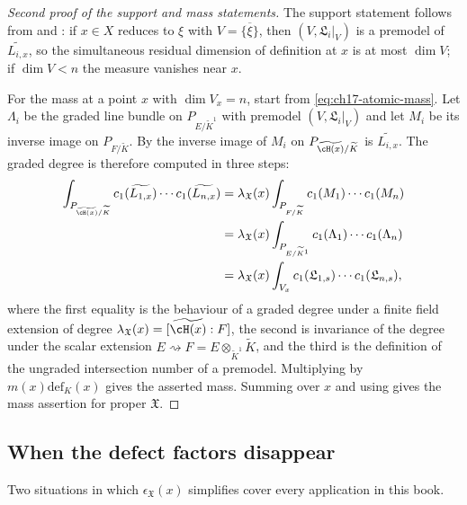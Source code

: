 \begin{proof}[Second proof of the support and mass statements]
The support statement follows from  and
: if $x\in X$ reduces to $\xi$ with
$V=\overline{\{\xi\}}$, then $(V,\mathfrak L_i|_V)$ is a premodel of
$\widetilde{L_{i,x}}$, so the simultaneous residual dimension of
definition at $x$ is at most $\dim V$; if $\dim V<n$ the measure
vanishes near $x$.

For the mass at a point $x$ with $\dim V_x=n$, start from
\eqref{eq:ch17-atomic-mass}.  Let $\Lambda_i$ be the graded line bundle on
$P_{E/\widetilde K^1}$ with premodel $(V,\mathfrak L_i|_V)$ and let
$M_i$ be its inverse image on $P_{F/\widetilde K}$.  By
 the inverse image of $M_i$ on
$P_{\widetilde{\cH(x)}/\widetilde K}$ is $\widetilde{L_{i,x}}$.  The
graded degree is therefore computed in three steps:
\[
\begin{split}
 \int_{P_{\widetilde{\cH(x)}/\widetilde K}}
   c_1(\widetilde{L_{1,x}})\cdots c_1(\widetilde{L_{n,x}})
 &=\lambda_{\mathfrak X}(x)
   \int_{P_{F/\widetilde K}}c_1(M_1)\cdots c_1(M_n)\\
 &=\lambda_{\mathfrak X}(x)
   \int_{P_{E/\widetilde K^1}}c_1(\Lambda_1)\cdots c_1(\Lambda_n)\\
 &=\lambda_{\mathfrak X}(x)
   \int_{V_x}c_1(\mathfrak L_{1,s})\cdots c_1(\mathfrak L_{n,s}),
\end{split}
\]
where the first equality is the behaviour of a graded degree under a finite
field extension of degree $\lambda_{\mathfrak X}(x)=[\widetilde{\cH(x)}:F]$,
the second is invariance of the degree under the scalar extension
$E\rightsquigarrow F=E\otimes_{\widetilde K^1}\widetilde K$, and the third
is the definition of the ungraded intersection number of a premodel.
Multiplying by $m(x)\mathrm{def}_K(x)$ gives the asserted mass.  Summing
over $x$ and using  gives the mass assertion for
proper $\mathfrak X$.
\end{proof}

\subsection{When the defect factors disappear}
\label{sec:ch17-defect-vanishes}

Two situations in which $\epsilon_{\mathfrak X}(x)$ simplifies cover every
application in this book.

